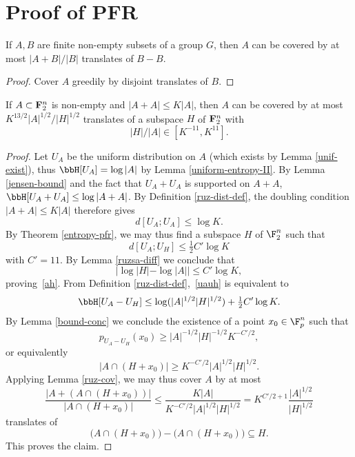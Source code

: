 \chapter{Proof of PFR}

\begin{lemma}
\label{ruz-cov}
\leanok
If $A,B$ are finite non-empty subsets of a group $G$, then $A$ can be covered by at most $|A+B|/|B|$ translates of $B-B$.
\end{lemma}
\begin{proof}
\leanok
Cover $A$ greedily by disjoint translates of $B$.
\end{proof}

\begin{lemma}\label{pfr_aux}
\leanok If $A \subset {\bf F}_2^n$ is non-empty and
$|A+A| \leq K|A|$, then $A$ can be covered by at most $K ^
{13/2}|A|^{1/2}/|H|^{1/2}$ translates of a subspace $H$ of ${\bf F}_2^n$ with
\begin{equation}
  \label{ah}
  |H|/|A| \in [K^{-11}, K^{11}].
\end{equation}
\end{lemma}
\begin{proof}
\leanok
  Let $U_A$ be the uniform distribution on $A$ (which exists by Lemma \ref{unif-exist}), thus $\bbH[U_A] = \log |A|$ by Lemma \ref{uniform-entropy-II}. By Lemma \ref{jensen-bound} and the fact that $U_A + U_A$ is supported on $A + A$, $\bbH[U_A + U_A] \leq \log|A+A|$. By Definition \ref{ruz-dist-def}, the doubling condition $|A+A| \leq K|A|$ therefore gives
  \[d[U_A;U_A] \leq \log K.\]
  By Theorem \ref{entropy-pfr}, we may thus find a subspace $H$ of $\F_2^n$ such that
  \begin{equation}\label{uauh} d[U_A;U_H] \leq \tfrac{1}{2} C' \log K\end{equation}
  with $C' = 11$.
  By Lemma \ref{ruzsa-diff} we conclude that
  \begin{equation*}
    |\log |H| - \log |A|| \leq C' \log K,
  \end{equation*}
  proving~\eqref{ah}.
  From Definition \ref{ruz-dist-def},~\eqref{uauh} is equivalent to
  \[\bbH[U_A - U_H] \leq \log( |A|^{1/2} |H|^{1/2}) + \tfrac{1}{2} C' \log K.\]
  By Lemma \ref{bound-conc} we conclude the existence of a point $x_0 \in \F_p^n$ such that
  \[p_{U_A-U_H}(x_0) \geq |A|^{-1/2} |H|^{-1/2} K^{-C'/2},\]
  or equivalently
  \[|A \cap (H + x_0)| \geq K^{-C'/2} |A|^{1/2} |H|^{1/2}.\]
  Applying Lemma \ref{ruz-cov}, we may thus cover $A$ by at most
  \[\frac{|A + (A \cap (H+x_0))|}{|A \cap (H + x_0)|} \leq \frac{K|A|}{K^{-C'/2} |A|^{1/2} |H|^{1/2}} = K^{C'/2+1} \frac{|A|^{1/2}}{|H|^{1/2}}\]
  translates of
  \[\bigl(A \cap (H + x_0)\bigr) - \bigl(A \cap (H + x_0)\bigr) \subseteq H.\]
  This proves the claim.
\end{proof}


